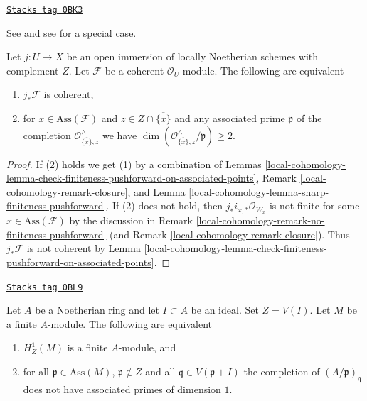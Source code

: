\begin{proposition}
\label{local-cohomology-proposition-kollar}
\href{https://stacks.math.columbia.edu/tag/0BK3}{\texttt{Stacks tag 0BK3}}

\begin{reference}
See \cite{k-coherent} and see \cite[IV, Proposition 7.2.2]{EGA}
for a special case.
\end{reference}

Let $j : U \to X$ be an open immersion of locally Noetherian schemes
with complement $Z$. Let $\mathcal{F}$ be a coherent $\mathcal{O}_U$-module.
The following are equivalent
\begin{enumerate}
\item $j_*\mathcal{F}$ is coherent,
\item for $x \in \text{Ass}(\mathcal{F})$ and
$z \in Z \cap \overline{\{x\}}$ and any associated prime
$\mathfrak p$ of the completion $\mathcal{O}_{\overline{\{x\}}, z}^\wedge$
we have $\dim(\mathcal{O}_{\overline{\{x\}}, z}^\wedge/\mathfrak p) \geq 2$.
\end{enumerate}
\end{proposition}

\begin{proof}
If (2) holds we get (1) by a combination of
Lemmas \ref{local-cohomology-lemma-check-finiteness-pushforward-on-associated-points},
Remark \ref{local-cohomology-remark-closure}, and
Lemma \ref{local-cohomology-lemma-sharp-finiteness-pushforward}.
If (2) does not hold, then $j_*i_{x, *}\mathcal{O}_{W_x}$ is not finite
for some $x \in \text{Ass}(\mathcal{F})$ by the discussion in
Remark \ref{local-cohomology-remark-no-finiteness-pushforward}
(and Remark \ref{local-cohomology-remark-closure}).
Thus $j_*\mathcal{F}$ is not coherent by
Lemma \ref{local-cohomology-lemma-check-finiteness-pushforward-on-associated-points}.
\end{proof}

\begin{lemma}
\label{local-cohomology-lemma-kollar-finiteness-H1-local}
\href{https://stacks.math.columbia.edu/tag/0BL9}{\texttt{Stacks tag 0BL9}}

Let $A$ be a Noetherian ring and let $I \subset A$ be an ideal.
Set $Z = V(I)$. Let $M$ be a finite $A$-module. The following
are equivalent
\begin{enumerate}
\item $H^1_Z(M)$ is a finite $A$-module, and
\item for all $\mathfrak p \in \text{Ass}(M)$, $\mathfrak p \not \in Z$
and all $\mathfrak q \in V(\mathfrak p + I)$ the completion of
$(A/\mathfrak p)_\mathfrak q$ does not have associated primes
of dimension $1$.
\end{enumerate}
\end{lemma}


